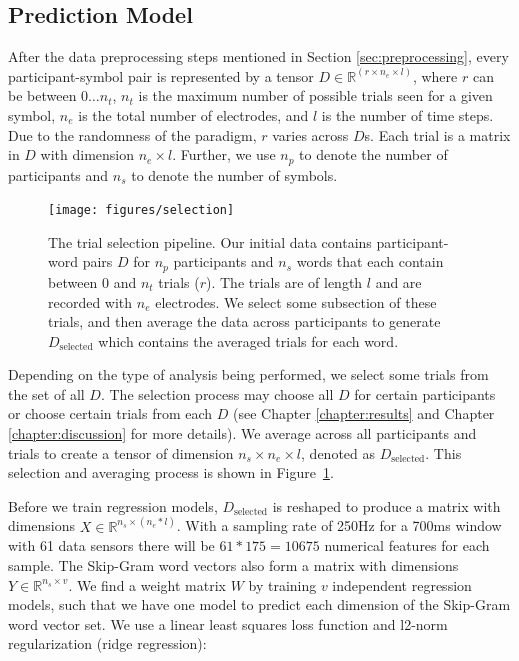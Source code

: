 \subsection{Prediction Model}

After the data preprocessing steps mentioned in Section 
\ref{sec:preprocessing}, every participant-symbol pair is represented by a 
tensor $D \in \mathbb{R}^{(r \times n_e \times l)}$, where $r$ can be between 
$0 \ldots n_t$, $n_t$ is the maximum number of possible trials seen for a given 
symbol, $n_e$ is the total number of electrodes, and $l$ is the number of time 
steps. Due to the randomness of the paradigm, $r$ varies across $D$s. Each 
trial is a matrix in $D$ with dimension $n_e \times l$. Further, we use $n_p$ 
to denote the number of participants and $n_s$ to denote the number of symbols. 

\begin{figure}[!b]
  \centerline{
    \texttt{[image: figures/selection]}
  }
  \caption[Trial Selection Pipeline]{
    The trial selection pipeline. Our initial data contains participant-word 
    pairs $D$ for $n_p$ participants and $n_s$ words that each contain between 
    0 and $n_t$ trials ($r$). The trials are of length $l$ and are recorded 
    with $n_e$ electrodes. We select some subsection of these trials, and then 
    average the data across participants to generate $D_{\text{selected}}$ 
    which contains the averaged trials for each word.
  }
  \label{fig:selection}
\end{figure}

Depending on the type of analysis being performed, we select some trials from 
the set of all $D$. The selection process may choose all $D$ for certain 
participants or choose certain trials from each $D$ (see Chapter 
\ref{chapter:results} and Chapter \ref{chapter:discussion} for more details).  
We average across all participants and trials to create a tensor of dimension 
$n_s \times n_e \times l$, denoted as $D_\text{selected}$. This selection and 
averaging process is shown in Figure~\ref{fig:selection}.

Before we train regression models, $D_{\text{selected}}$ is reshaped to produce 
a matrix with dimensions $X \in \mathbb{R}^{n_s \times (n_e * l)}$.  With a 
sampling rate of 250Hz for a 700ms window with 61 data sensors there will be 
$61*175 = 10675$ numerical features for each sample. The Skip-Gram word vectors 
also form a matrix with dimensions $Y \in \mathbb{R}^{n_s \times v}$. We find a 
weight matrix $W$ by training $v$ independent regression models, such that we 
have one model to predict each dimension of the Skip-Gram word vector set. We 
use a linear least squares loss function and l2-norm regularization (ridge 
regression):

